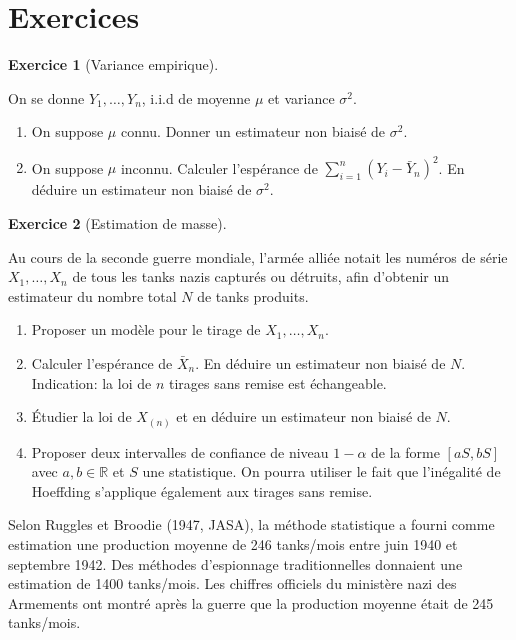\documentclass[
  10,
  letterpaper,
  DIV=11,
  numbers=noendperiod]{scrreport}
\providecommand{\tightlist}{%
  \setlength{\itemsep}{0pt}\setlength{\parskip}{0pt}}\usepackage{longtable,booktabs,array}
\theoremstyle{plain}
\theoremstyle{definition}
\newtheorem{exercise}{Exercice}[chapter]
\theoremstyle{plain}
\theoremstyle{definition}
\theoremstyle{definition}
\theoremstyle{plain}
\theoremstyle{remark}
\begin{document}
\hypertarget{exercices-1}{%
\section*{Exercices}\label{exercices-1}}


\begin{exercise}[Variance
empirique]\protect\hypertarget{exr-varemp}{}\label{exr-varemp}

On se donne \(Y_1, \dots, Y_n\), i.i.d de moyenne \(\mu\) et variance
\(\sigma^2\).

\begin{enumerate}
\def\labelenumi{\arabic{enumi}.}
\tightlist
\item
  On suppose \(\mu\) connu. Donner un estimateur non biaisé de
  \(\sigma^2\).
\item
  On suppose \(\mu\) inconnu. Calculer l'espérance de
  \(\sum_{i=1}^n (Y_i - \bar{Y}_n)^2\). En déduire un estimateur non
  biaisé de \(\sigma^2\).
\end{enumerate}

\end{exercise}

\begin{exercise}[Estimation de
masse]\protect\hypertarget{exr-tanks}{}\label{exr-tanks}

Au cours de la seconde guerre mondiale, l'armée alliée notait les
numéros de série \(X_1, \dots, X_n\) de tous les tanks nazis capturés ou
détruits, afin d'obtenir un estimateur du nombre total \(N\) de tanks
produits.

\begin{enumerate}
\def\labelenumi{\arabic{enumi}.}
\tightlist
\item
  Proposer un modèle pour le tirage de \(X_1, \dots, X_n\).
\item
  Calculer l'espérance de \(\bar X_n\). En déduire un estimateur non
  biaisé de \(N\). Indication: la loi de \(n\) tirages sans remise est
  échangeable.
\item
  Étudier la loi de \(X_{(n)}\) et en déduire un estimateur non biaisé
  de \(N\).
\item
  Proposer deux intervalles de confiance de niveau \(1-\alpha\) de la
  forme \([aS, bS]\) avec \(a, b\in\mathbb{R}\) et \(S\) une
  statistique. On pourra utiliser le fait que l'inégalité de Hoeffding
  s'applique également aux tirages sans remise.
\end{enumerate}

Selon Ruggles et Broodie (1947, JASA), la méthode statistique a fourni
comme estimation une production moyenne de 246 tanks/mois entre juin
1940 et septembre 1942. Des méthodes d'espionnage traditionnelles
donnaient une estimation de 1400 tanks/mois. Les chiffres officiels du
ministère nazi des Armements ont montré après la guerre que la
production moyenne était de 245 tanks/mois.

\end{exercise}
\end{document}
